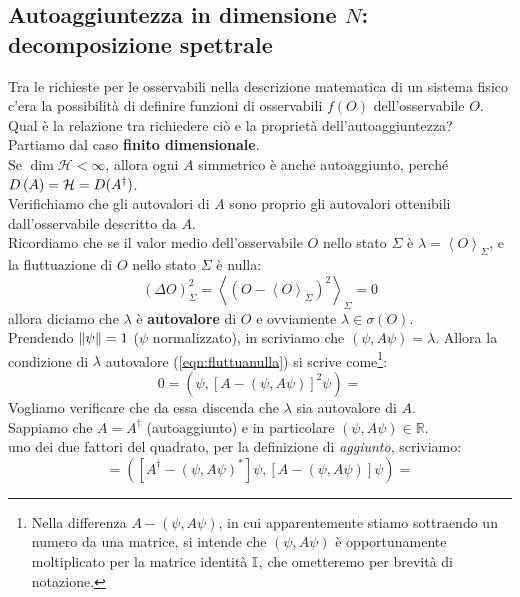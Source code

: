 \documentclass[../../FisicaTeorica.tex]{subfiles}
\begin{document}
\subsection{Autoaggiuntezza in dimensione $N$: decomposizione spettrale}
Tra le richieste per le osservabili nella descrizione matematica di un sistema fisico c'era la possibilità di definire funzioni di osservabili $f(O)$ dell'osservabile $O$. Qual è la relazione tra richiedere ciò e la proprietà dell'autoaggiuntezza?\\

Partiamo dal caso \textbf{finito dimensionale}.\\
Se $\dim{\mathcal{H}<\infty}$, allora ogni $A$ simmetrico è anche autoaggiunto, perché $D\left(A\right)= \mathcal{H} = D(A^\dag)$.\\
Verifichiamo che gli autovalori di $A$ sono proprio gli autovalori ottenibili dall'osservabile descritto da $A$.\\
Ricordiamo che se il valor medio dell'osservabile $O$ nello stato $\Sigma$ è $\lambda=\left\langle O\right\rangle_\Sigma$, e la fluttuazione di $O$ nello stato $\Sigma$ è nulla:
\begin{equation}
\left(\Delta O\right)_\Sigma^2=\left\langle\left(O-\left\langle O\right\rangle_\Sigma\right)^2\right\rangle_\Sigma=0
\label{eqn:fluttuanulla}
\end{equation}
allora diciamo che $\lambda$ è \textbf{autovalore} di $O$ e ovviamente  $\lambda \in \sigma \left(O\right)$.\\
Prendendo $\left\lVert\psi\right\rVert=1$ ($\psi$ normalizzato), in \MQ scriviamo che $(\psi,A\psi) = \lambda$. Allora la condizione di $\lambda$ autovalore (\ref{eqn:fluttuanulla}) si scrive come\footnote{Nella differenza $A-(\psi,A\psi)$, in cui apparentemente stiamo sottraendo un numero da una matrice, si intende che $(\psi,A\psi)$ è opportunamente moltiplicato per la matrice identità $\mathbb{I}$, che ometteremo per brevità di notazione.}:
\[
0=\left(\psi, \left[A-\left(\psi,A\psi\right)\right]^2\psi\right) =
\]
Vogliamo verificare che da essa discenda che $\lambda$ sia autovalore di $A$.\\
Sappiamo che $A=A^\dag$ (autoaggiunto) e in particolare $\left(\psi,A\psi\right)\in\mathbb{R}$.\\
 uno dei due fattori del quadrato, per la definizione di \textit{aggiunto}, scriviamo:
\[
=\left(\left[A^\dag-\left(\psi,A\psi\right)^*\right]\psi, \left[A-\left(\psi,A\psi\right)\right]\psi\right)=
\]
\end{document}
